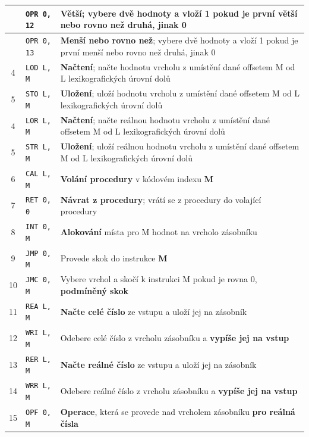 \documentclass[
12pt,
a4paper,
pdftex,
czech,
titlepage
]{report}
\begin{document}
\begin{longtable}{|c|l|p{10cm}|}
\rule{0pt}{3ex} & \texttt{OPR 0, 12} & \textbf{Větší}; vybere dvě hodnoty a vloží 1 pokud je první větší nebo rovno než druhá, jinak 0 \\ \hline
\rule{0pt}{3ex} & \texttt{OPR 0, 13} & \textbf{Menší nebo rovno než}; vybere dvě hodnoty a vloží 1 pokud je první menší nebo rovno než druhá, jinak 0 \\ \hline
\rule{0pt}{3ex}4 & \texttt{LOD L, M} & \textbf{Načtení}; načte hodnotu vrcholu z umístění dané offsetem M od L lexikografických úrovní dolů \\ \hline
\rule{0pt}{3ex}5 & \texttt{STO L, M} & \textbf{Uložení}; uloží hodnotu vrcholu z umístění dané offsetem M od L lexikografických úrovní dolů \\ \hline
\rule{0pt}{3ex}4 & \texttt{LOR L, M} & \textbf{Načtení}; načte reálnou hodnotu vrcholu z umístění dané offsetem M od L lexikografických úrovní dolů \\ \hline
\rule{0pt}{3ex}5 & \texttt{STR L, M} & \textbf{Uložení}; uloží reálnou hodnotu vrcholu z umístění dané offsetem M od L lexikografických úrovní dolů \\ \hline
\rule{0pt}{3ex}6 & \texttt{CAL L, M} & \textbf{Volání procedury} v kódovém indexu \textbf{M} \\ \hline
\rule{0pt}{3ex}7 & \texttt{RET 0, 0} & \textbf{Návrat z procedury}; vrátí se z procedury do volající procedury \\ \hline
\rule{0pt}{3ex}8 & \texttt{INT 0, M} & \textbf{Alokování} místa pro M hodnot na vrcholo zásobníku \\ \hline
\rule{0pt}{3ex}9 & \texttt{JMP 0, M} & Provede skok do instrukce \textbf{M} \\ \hline
\rule{0pt}{3ex}10 & \texttt{JMC 0, M} & Vybere vrchol a skočí k instrukci M pokud je rovna 0, \textbf{podmíněný skok} \\ \hline
\rule{0pt}{3ex}11 & \texttt{REA L, M} & \textbf{Načte celé číslo} ze vstupu a uloží jej na zásobník \\ \hline
\rule{0pt}{3ex}12 & \texttt{WRI L, M} & Odebere celé číslo z vrcholu zásobníku a \textbf{vypíše jej na vstup} \\ \hline
\rule{0pt}{3ex}13 & \texttt{RER L, M} & \textbf{Načte reálné číslo} ze vstupu a uloží jej na zásobník \\ \hline
\rule{0pt}{3ex}14 & \texttt{WRR L, M} & Odebere reálné číslo z vrcholu zásobníku a \textbf{vypíše jej na vstup} \\ \hline
\rule{0pt}{3ex}15 & \texttt{OPF 0, M} & \textbf{Operace}, která se provede nad vrcholem zásobníku \textbf{pro reálná čísla} \\ \hline

\end{longtable}
\end{document}
